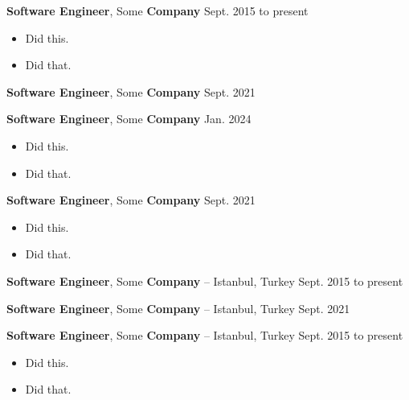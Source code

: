 \documentclass[10pt, letterpaper]{article}
\newenvironment{highlights}{
        \begin{itemize}[
                topsep=0pt,
                partopsep=0pt,
                itemsep=0pt,
                leftmargin=10pt
            ]
    }{
        \end{itemize}
    } %
\begin{document}
        \textbf{Software Engineer}, Some \textbf{Company} \hfill Sept. 2015 to present

        \begin{highlights}
        \item Did this.
        \item Did that.
        \end{highlights}


        \vspace{8pt}

        \textbf{Software Engineer}, Some \textbf{Company} \hfill Sept. 2021



        \vspace{8pt}

        \textbf{Software Engineer}, Some \textbf{Company} \hfill Jan. 2024

        \begin{highlights}
        \item Did this.
        \item Did that.
        \end{highlights}


        \vspace{8pt}

        \textbf{Software Engineer}, Some \textbf{Company} \hfill Sept. 2021

        \begin{highlights}
        \item Did this.
        \item Did that.
        \end{highlights}


        \vspace{8pt}

        \textbf{Software Engineer}, Some \textbf{Company} -- Istanbul, Turkey \hfill Sept. 2015 to present



        \vspace{8pt}

        \textbf{Software Engineer}, Some \textbf{Company} -- Istanbul, Turkey \hfill Sept. 2021



        \vspace{8pt}

        \textbf{Software Engineer}, Some \textbf{Company} -- Istanbul, Turkey \hfill Sept. 2015 to present

        \begin{highlights}
        \item Did this.
        \item Did that.
        \end{highlights}
\end{document}
